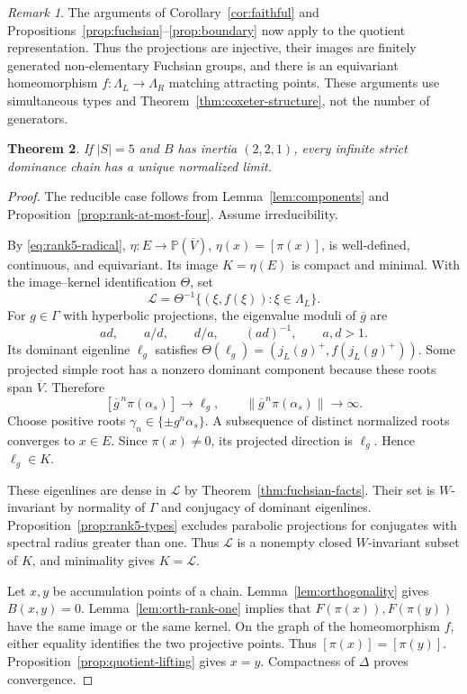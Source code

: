 \documentclass[11pt,reqno]{amsart}
\theoremstyle{plain}
\newtheorem{theorem}{Theorem}[section]
\theoremstyle{definition}
\theoremstyle{remark}
\newtheorem{remark}[theorem]{Remark}
\numberwithin{equation}{section}
\begin{document}
\begin{remark}\label{rem:rank5-projections}
The arguments of Corollary~\ref{cor:faithful} and Propositions~\ref{prop:fuchsian}--\ref{prop:boundary} now apply to the quotient representation. Thus the projections are injective, their images are finitely generated non-elementary Fuchsian groups, and there is an equivariant homeomorphism $f:\Lambda_L\to\Lambda_R$ matching attracting points. These arguments use simultaneous types and Theorem~\ref{thm:coxeter-structure}, not the number of generators.
\end{remark}

\begin{theorem}\label{thm:rank5-221}
If $|S|=5$ and $B$ has inertia $(2,2,1)$, every infinite strict dominance chain has a unique normalized limit.
\end{theorem}
\begin{proof}
The reducible case follows from Lemma~\ref{lem:components} and Proposition~\ref{prop:rank-at-most-four}. Assume irreducibility.

By \eqref{eq:rank5-radical}, $\eta:E\to\mathbb P(\overline V)$, $\eta(x)=[\pi(x)]$, is well-defined, continuous, and equivariant. Its image $K=\eta(E)$ is compact and minimal. With the image--kernel identification $\Theta$, set
\[
\mathcal L=\Theta^{-1}\{(\xi,f(\xi)):\xi\in\Lambda_L\}.
\]
For $g\in\Gamma$ with hyperbolic projections, the eigenvalue moduli of $\overline g$ are
\[
ad,\qquad a/d,\qquad d/a,\qquad(ad)^{-1},\qquad a,d>1.
\]
Its dominant eigenline $\ell_g$ satisfies $\Theta(\ell_g)=(j_L(g)^+,f(j_L(g)^+))$. Some projected simple root has a nonzero dominant component because these roots span $\overline V$. Therefore
\[
[\overline g^{\,n}\pi(\alpha_s)]\longrightarrow\ell_g,\qquad
\|\overline g^{\,n}\pi(\alpha_s)\|\longrightarrow\infty.
\]
Choose positive roots $\gamma_n\in\{\pm g^n\alpha_s\}$. A subsequence of distinct normalized roots converges to $x\in E$. Since $\pi(x)\neq0$, its projected direction is $\ell_g$. Hence $\ell_g\in K$.

These eigenlines are dense in $\mathcal L$ by Theorem~\ref{thm:fuchsian-facts}. Their set is $W$-invariant by normality of $\Gamma$ and conjugacy of dominant eigenlines. Proposition~\ref{prop:rank5-types} excludes parabolic projections for conjugates with spectral radius greater than one. Thus $\mathcal L$ is a nonempty closed $W$-invariant subset of $K$, and minimality gives $K=\mathcal L$.

Let $x,y$ be accumulation points of a chain. Lemma~\ref{lem:orthogonality} gives $B(x,y)=0$. Lemma~\ref{lem:orth-rank-one} implies that $F(\pi(x)),F(\pi(y))$ have the same image or the same kernel. On the graph of the homeomorphism $f$, either equality identifies the two projective points. Thus $[\pi(x)]=[\pi(y)]$. Proposition~\ref{prop:quotient-lifting} gives $x=y$. Compactness of $\Delta$ proves convergence.
\end{proof}
\end{document}
